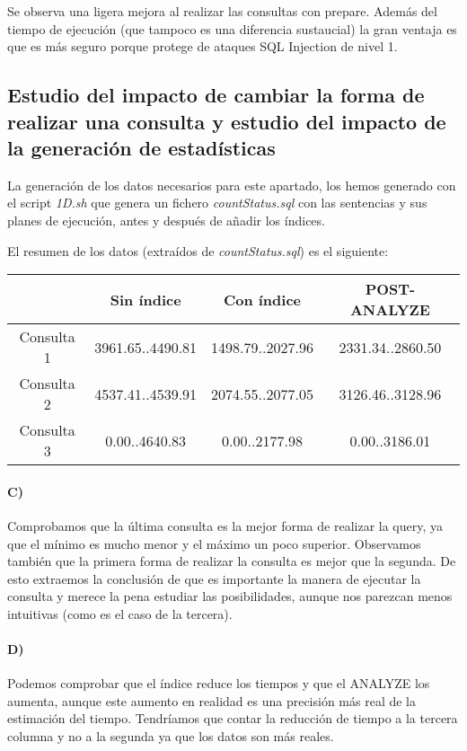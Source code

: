 \documentclass{article}
\begin{document}
Se observa una ligera mejora al realizar las consultas con prepare. Además del tiempo de ejecución (que tampoco es una diferencia sustaucial) la gran ventaja es que es más seguro porque protege de ataques SQL Injection de nivel 1.

\subsection{Estudio del impacto de cambiar la forma de realizar una consulta y estudio del impacto de la generación de estadísticas}


La generación de los datos necesarios para este apartado, los hemos generado con el script \textit{1D.sh} que genera un fichero \textit{countStatus.sql} con las sentencias y sus planes de ejecución, antes y después de añadir los índices. 

El resumen de los datos (extraídos de \textit{countStatus.sql}) es el siguiente:

\begin{tabular}{c|c|c|c}
& Sin índice & Con índice & POST-ANALYZE \\\hline
Consulta 1 & 3961.65..4490.81 & 1498.79..2027.96& 2331.34..2860.50\\
Consulta 2 & 4537.41..4539.91 &2074.55..2077.05&3126.46..3128.96\\
Consulta 3 & 0.00..4640.83 & 0.00..2177.98 & 0.00..3186.01
\end{tabular}

\paragraph{C)} Comprobamos que la última consulta es la mejor forma de realizar la query, ya que el mínimo es mucho menor y el máximo un poco superior. Observamos también que la primera forma de realizar la consulta es mejor que la segunda. De esto extraemos la conclusión de que es importante la manera de ejecutar la consulta y merece la pena estudiar las posibilidades, aunque nos parezcan menos intuitivas (como es el caso de la tercera).

\paragraph{D)}
Podemos comprobar que el índice reduce los tiempos y que el ANALYZE los aumenta, aunque este aumento en realidad es una precisión más real de la estimación del tiempo. Tendríamos que contar la reducción de tiempo a la tercera columna y no a la segunda ya que los datos son más reales.
\end{document}
